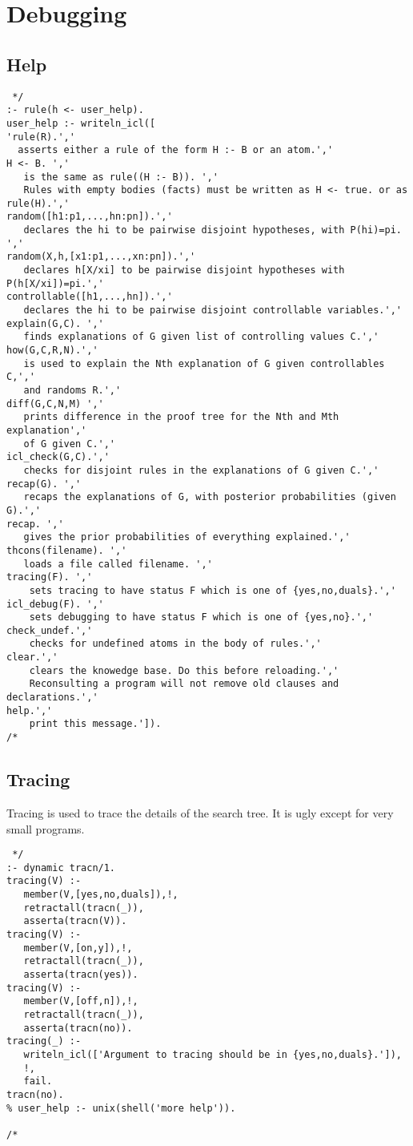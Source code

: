 \documentclass[11pt,fleqn]{article}
\begin{document}
\section{Debugging}
\subsection{Help}
\begin{verbatim} */
:- rule(h <- user_help).
user_help :- writeln_icl([
'rule(R).','
  asserts either a rule of the form H :- B or an atom.','
H <- B. ','
   is the same as rule((H :- B)). ','
   Rules with empty bodies (facts) must be written as H <- true. or as rule(H).','
random([h1:p1,...,hn:pn]).','
   declares the hi to be pairwise disjoint hypotheses, with P(hi)=pi. ','
random(X,h,[x1:p1,...,xn:pn]).','
   declares h[X/xi] to be pairwise disjoint hypotheses with P(h[X/xi])=pi.','
controllable([h1,...,hn]).','
   declares the hi to be pairwise disjoint controllable variables.','
explain(G,C). ','
   finds explanations of G given list of controlling values C.','
how(G,C,R,N).','
   is used to explain the Nth explanation of G given controllables C,','
   and randoms R.',' 
diff(G,C,N,M) ','
   prints difference in the proof tree for the Nth and Mth explanation','
   of G given C.','
icl_check(G,C).','
   checks for disjoint rules in the explanations of G given C.','
recap(G). ','
   recaps the explanations of G, with posterior probabilities (given G).','
recap. ','
   gives the prior probabilities of everything explained.','
thcons(filename). ','
   loads a file called filename. ','
tracing(F). ','
    sets tracing to have status F which is one of {yes,no,duals}.','
icl_debug(F). ','
    sets debugging to have status F which is one of {yes,no}.','
check_undef.','
    checks for undefined atoms in the body of rules.','
clear.','
    clears the knowedge base. Do this before reloading.','
    Reconsulting a program will not remove old clauses and declarations.','
help.','
    print this message.']).
/* \end{verbatim}

\subsection{Tracing}
Tracing is used to trace the details of the search tree. It is ugly
except for very small programs.
\begin{verbatim} */
:- dynamic tracn/1.
tracing(V) :-
   member(V,[yes,no,duals]),!,
   retractall(tracn(_)),
   asserta(tracn(V)).
tracing(V) :-
   member(V,[on,y]),!,
   retractall(tracn(_)),
   asserta(tracn(yes)).
tracing(V) :-
   member(V,[off,n]),!,
   retractall(tracn(_)),
   asserta(tracn(no)).
tracing(_) :-
   writeln_icl(['Argument to tracing should be in {yes,no,duals}.']),
   !,
   fail.
tracn(no).
% user_help :- unix(shell('more help')).

/* \end{verbatim}
\end{document}
